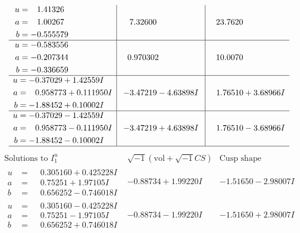 \documentclass[1p]{elsarticle_modified}
\theoremstyle{definition}
\newcommand{\I}{\sqrt{-1}}
\begin{document}
$$\begin{array}{c|c|c}
\begin{aligned}
u &= \phantom{-}1.41326\phantom{ +0.000000I} \\
a &= \phantom{-}1.00267\phantom{ +0.000000I} \\
b &= -0.555579\phantom{ +0.000000I}\end{aligned}
 & \phantom{-}7.32600\phantom{ +0.000000I} & \phantom{-}23.7620\phantom{ +0.000000I} \\ \hline\begin{aligned}
u &= -0.583556\phantom{ +0.000000I} \\
a &= -0.207344\phantom{ +0.000000I} \\
b &= -0.336659\phantom{ +0.000000I}\end{aligned}
 & \phantom{-}0.970302\phantom{ +0.000000I} & \phantom{-}10.0070\phantom{ +0.000000I} \\ \hline\begin{aligned}
u &= -0.37029 + 1.42559 I \\
a &= \phantom{-}0.958773 + 0.111950 I \\
b &= -1.88452 + 0.10002 I\end{aligned}
 & -3.47219 - 4.63898 I & \phantom{-}1.76510 + 3.68966 I \\ \hline\begin{aligned}
u &= -0.37029 - 1.42559 I \\
a &= \phantom{-}0.958773 - 0.111950 I \\
b &= -1.88452 - 0.10002 I\end{aligned}
 & -3.47219 + 4.63898 I & \phantom{-}1.76510 - 3.68966 I\\
 \hline 
 \end{array}$$\newpage$$\begin{array}{c|c|c}  
\text{Solutions to }I^u_{1}& \I (\text{vol} + \sqrt{-1}CS) & \text{Cusp shape}\\
 \hline 
\begin{aligned}
u &= \phantom{-}0.305160 + 0.425228 I \\
a &= \phantom{-}0.75251 + 1.97105 I \\
b &= \phantom{-}0.656252 - 0.746018 I\end{aligned}
 & -0.88734 + 1.99220 I & -1.51650 - 2.98007 I \\ \hline\begin{aligned}
u &= \phantom{-}0.305160 - 0.425228 I \\
a &= \phantom{-}0.75251 - 1.97105 I \\
b &= \phantom{-}0.656252 + 0.746018 I\end{aligned}
 & -0.88734 - 1.99220 I & -1.51650 + 2.98007 I \\ \hline\begin{aligned}

\end{aligned}
\end{array}$$
\end{document}
